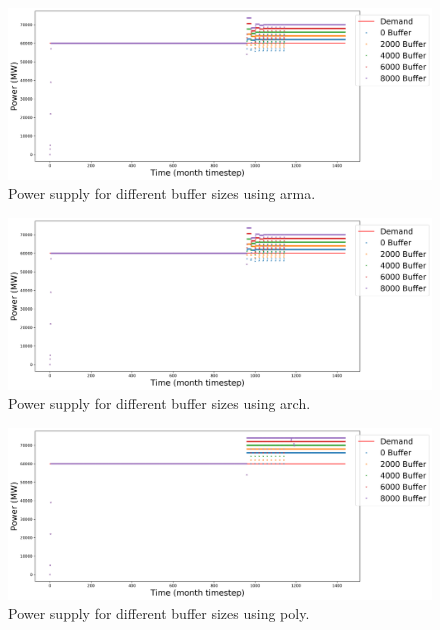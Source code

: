 \documentclass[11pt]{article}
\begin{document}
\begin{figure}[!h]
	\centering
	\includegraphics[width=\textwidth]{23-figures/23-power-buffer-arma.png} 
	\hfill
    \caption{Power supply for different buffer sizes using arma.}
	\label{fig:23-buf-arma}
\end{figure}

\begin{figure}[!h]
	\centering
	\includegraphics[width=\textwidth]{23-figures/23-power-buffer-arch.png} 
	\hfill
    \caption{Power supply for different buffer sizes using arch.}
	\label{fig:23-buf-arch}
\end{figure}

\begin{figure}[!h]
	\centering
	\includegraphics[width=\textwidth]{23-figures/23-power-buffer-poly.png} 
	\hfill
    \caption{Power supply for different buffer sizes using poly.}
	\label{fig:23-buf-poly}
\end{figure}
\end{document}
